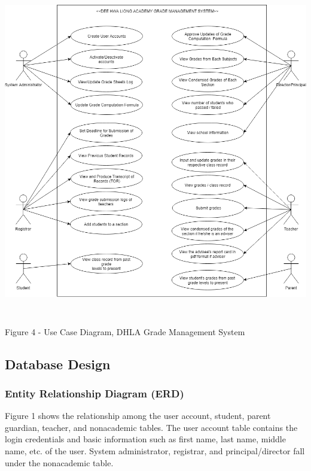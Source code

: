 \documentclass[11pt,a4paper,titlepage]{article}
\begin{document}
\vspace{2cm}
\begin{center}
\includegraphics[height=14.5cm]{Activity-Diagram-1.png}
\end{center}
\vspace{2cm}
\begin{center}
    Figure 4 - Use Case Diagram, DHLA Grade Management System
\end{center}

\newpage
\subsection{Database Design}

\subsubsection{Entity Relationship Diagram (ERD)}

Figure 1 shows the relationship among the user account, student, parent guardian, teacher, and nonacademic tables. The user account table contains the login credentials and basic information such as first name, last name, middle name, etc. of the user. System administrator, registrar, and principal/director fall under the nonacademic table.
\end{document}
